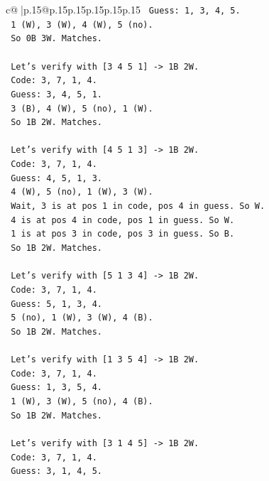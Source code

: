 \documentclass{article}
\begin{document}
{\begin{supertabular}{c@{$\;$}|p{.15\linewidth}@{}p{.15\linewidth}p{.15\linewidth}p{.15\linewidth}p{.15\linewidth}p{.15\linewidth}}
{{{\texttt{   Guess: 1, 3, 4, 5.} \\
\texttt{   1 (W), 3 (W), 4 (W), 5 (no).} \\
\texttt{   So 0B 3W. Matches.} \\
\\ 
\texttt{   Let's verify with {[}3 4 5 1{]} {-}> 1B 2W.} \\
\texttt{   Code: 3, 7, 1, 4.} \\
\texttt{   Guess: 3, 4, 5, 1.} \\
\texttt{   3 (B), 4 (W), 5 (no), 1 (W).} \\
\texttt{   So 1B 2W. Matches.} \\
\\ 
\texttt{   Let's verify with {[}4 5 1 3{]} {-}> 1B 2W.} \\
\texttt{   Code: 3, 7, 1, 4.} \\
\texttt{   Guess: 4, 5, 1, 3.} \\
\texttt{   4 (W), 5 (no), 1 (W), 3 (W).} \\
\texttt{   Wait, 3 is at pos 1 in code, pos 4 in guess. So W.} \\
\texttt{   4 is at pos 4 in code, pos 1 in guess. So W.} \\
\texttt{   1 is at pos 3 in code, pos 3 in guess. So B.} \\
\texttt{   So 1B 2W. Matches.} \\
\\ 
\texttt{   Let's verify with {[}5 1 3 4{]} {-}> 1B 2W.} \\
\texttt{   Code: 3, 7, 1, 4.} \\
\texttt{   Guess: 5, 1, 3, 4.} \\
\texttt{   5 (no), 1 (W), 3 (W), 4 (B).} \\
\texttt{   So 1B 2W. Matches.} \\
\\ 
\texttt{   Let's verify with {[}1 3 5 4{]} {-}> 1B 2W.} \\
\texttt{   Code: 3, 7, 1, 4.} \\
\texttt{   Guess: 1, 3, 5, 4.} \\
\texttt{   1 (W), 3 (W), 5 (no), 4 (B).} \\
\texttt{   So 1B 2W. Matches.} \\
\\ 
\texttt{   Let's verify with {[}3 1 4 5{]} {-}> 1B 2W.} \\
\texttt{   Code: 3, 7, 1, 4.} \\
\texttt{   Guess: 3, 1, 4, 5.} \\
}}}
\end{supertabular}}
\end{document}
